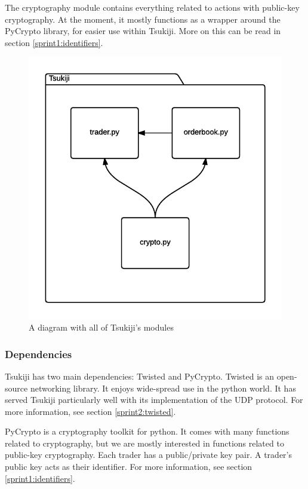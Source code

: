 The cryptography module contains everything related to actions with public-key cryptography.
At the moment, it mostly functions as a wrapper around the PyCrypto library, for easier use within Tsukiji.
More on this can be read in section \ref{sprint1:identifiers}.

\begin{figure}
  \centering
  \includegraphics[width=\textwidth]{modules}
  \caption{A diagram with all of Tsukiji's modules}
  \label{modulesfig}
\end{figure}

\subsubsection{Dependencies}
\label{dependencies}
Tsukiji has two main dependencies: Twisted\cite{twisted} and PyCrypto\cite{pycrypto}.
Twisted is an open-source networking library.
It enjoys wide-spread use in the python world.
It has served Tsukiji particularly well with its implementation of the UDP protocol.
For more information, see section \ref{sprint2:twisted}.

PyCrypto is a cryptography toolkit for python.
It comes with many functions related to cryptography, but we are mostly interested in functions related to public-key cryptography.
Each trader has a public/private key pair.
A trader's public key acts as their identifier.
For more information, see section \ref{sprint1:identifiers}.

